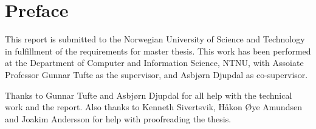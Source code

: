 \chapter*{Preface}
This report is submitted to the Norwegian University of Science and Technology
in fulfillment of the requirements for master thesis.  This work has been
performed at the Department of Computer and Information Science, NTNU, with
Assoiate Professor Gunnar Tufte as the supervisor, and Asbjørn Djupdal as
co-supervisor.

Thanks to Gunnar Tufte and Asbjørn Djupdal for all help with the technical work
and the report. Also thanks to Kenneth Sivertsvik, Håkon Øye Amundsen and Joakim
Andersson for help with proofreading the thesis.
